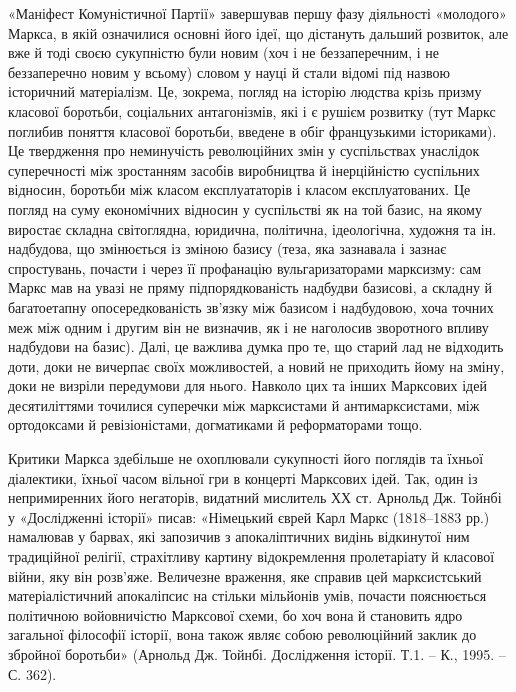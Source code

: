 «Маніфест Комуністичної Партії» завершував першу фазу діяльності 
«молодого» Маркса, в якій означилися основні його ідеї, що дістануть 
дальший розвиток, але вже й тоді своєю сукупністю були новим (хоч і не 
беззаперечним, і не беззаперечно новим у всьому) словом у науці й стали 
відомі під назвою історичний матеріалізм. Це, зокрема, погляд на 
історію людства крізь призму класової боротьби, соціальних 
антагонізмів, які і є рушієм розвитку (тут Маркс поглибив поняття 
класової боротьби, введене в обіг французькими істориками). Це 
твердження про неминучість революційних змін у суспільствах 
унаслідок суперечності між зростанням засобів виробництва й 
інерційністю суспільних відносин, боротьби між класом експлуататорів 
і класом експлуатованих. Це погляд на суму економічних відносин у 
суспільстві як на той базис, на якому виростає складна світоглядна, 
юридична, політична, ідеологічна, художня та ін. надбудова, що 
змінюється із зміною базису (теза, яка зазнавала і зазнає спростувань, 
почасти і через її профанацію вульгаризаторами марксизму: сам Маркс 
мав на увазі не пряму підпорядкованість надбудви базисові, а складну й 
багатоетапну опосередкованість зв'язку між базисом і надбудовою, хоча 
точних меж між одним і другим він не визначив, як і не наголосив 
зворотного впливу надбудови на базис). Далі, це важлива думка про те, що 
старий лад не відходить доти, доки не вичерпає своїх можливостей, а 
новий не приходить йому на зміну, доки не визріли передумови для нього. 
Навколо цих та інших Марксових ідей десятиліттями точилися суперечки 
між марксистами й антимарксистами, між ортодоксами й ревізіоністами, 
догматиками й реформаторами тощо.


Критики Маркса здебільше не охоплювали сукупності його поглядів та 
їхньої діалектики, їхньої часом вільної гри в концерті Марксових ідей. 
Так, один із непримиренних його негаторів, видатний мислитель ХХ ст. 
Арнольд Дж. Тойнбі у «Дослідженні історії» писав: «Німецький єврей 
Карл Маркс (1818--1883 рр.) намалював у барвах, які запозичив з 
апокаліптичних видінь відкинутої ним традиційної релігії, 
страхітливу картину відокремлення пролетаріату й класової війни, яку 
він розв'яже. Величезне враження, яке справив цей марксистський 
матеріалістичний апокаліпсис на стільки мільйонів умів, почасти 
пояснюється політичною войовничістю Марксової схеми, бо хоч вона й 
становить ядро загальної філософії історії, вона також являє собою 
революційний заклик до збройної боротьби» (Арнольд Дж. Тойнбі. 
Дослідження історії. Т.1. -- К., 1995. -- С. 362). 



